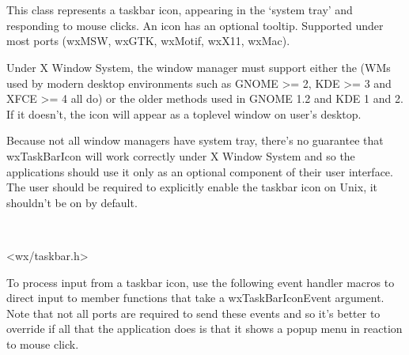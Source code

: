 \section{}\label{wxtaskbaricon}

This class represents a taskbar icon, appearing in the `system tray' and
responding to mouse clicks. An icon has an optional tooltip.  Supported under
most ports (wxMSW, wxGTK, wxMotif, wxX11, wxMac).


Under X Window System, the window manager must support either
the 
(WMs used by modern desktop environments such as GNOME >= 2, KDE
>= 3 and XFCE >= 4 all do) or the older methods used in GNOME 1.2 and
KDE 1 and 2. If it doesn't, the icon will appear as a toplevel window on
user's desktop.

Because not all window managers have system tray, there's no guarantee that
wxTaskBarIcon will work correctly under X Window System and so the applications
should use it only as an optional component of their user interface. The user
should be required to explicitly enable the taskbar icon on Unix, it shouldn't
be on by default.



\\


<wx/taskbar.h>


To process input from a taskbar icon, use the following event handler macros to direct input to member
functions that take a wxTaskBarIconEvent argument. Note that not all ports are
required to send these events and so it's better to override
 if all that
the application does is that it shows a popup menu in reaction to mouse click.

\twocolwidtha{7cm}
\begin{twocollist}\itemsep=0pt
\end{twocollist}%

